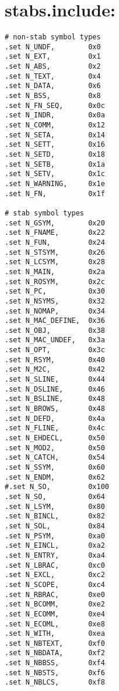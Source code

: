 \section{stabs.include:}
\label{anhang:stabs.include}
\begin{lstlisting}
# non-stab symbol types
.set N_UNDF,		0x0
.set N_EXT,			0x1
.set N_ABS,			0x2
.set N_TEXT,		0x4
.set N_DATA,		0x6
.set N_BSS,			0x8
.set N_FN_SEQ,		0x0c
.set N_INDR,		0x0a
.set N_COMM,		0x12
.set N_SETA,		0x14
.set N_SETT,		0x16
.set N_SETD,		0x18
.set N_SETB,		0x1a
.set N_SETV,		0x1c
.set N_WARNING,		0x1e
.set N_FN,			0x1f

# stab symbol types
.set N_GSYM,		0x20
.set N_FNAME,		0x22
.set N_FUN,			0x24
.set N_STSYM,		0x26
.set N_LCSYM,		0x28
.set N_MAIN,		0x2a
.set N_ROSYM,		0x2c
.set N_PC,			0x30
.set N_NSYMS,		0x32
.set N_NOMAP,		0x34
.set N_MAC_DEFINE,	0x36
.set N_OBJ,			0x38
.set N_MAC_UNDEF,	0x3a
.set N_OPT,			0x3c
.set N_RSYM,		0x40
.set N_M2C,			0x42
.set N_SLINE,		0x44
.set N_DSLINE,		0x46
.set N_BSLINE,		0x48
.set N_BROWS,		0x48
.set N_DEFD,		0x4a
.set N_FLINE,		0x4c
.set N_EHDECL,		0x50
.set N_MOD2,		0x50
.set N_CATCH,		0x54
.set N_SSYM,		0x60
.set N_ENDM,		0x62
#.set N_SO,			0x100
.set N_SO,			0x64
.set N_LSYM,		0x80
.set N_BINCL,		0x82
.set N_SOL,			0x84
.set N_PSYM,		0xa0
.set N_EINCL,		0xa2
.set N_ENTRY,		0xa4
.set N_LBRAC,		0xc0
.set N_EXCL,		0xc2
.set N_SCOPE,		0xc4
.set N_RBRAC,		0xe0
.set N_BCOMM,		0xe2
.set N_ECOMM,		0xe4
.set N_ECOML,		0xe8
.set N_WITH,		0xea
.set N_NBTEXT,		0xf0
.set N_NBDATA,		0xf2
.set N_NBBSS,		0xf4
.set N_NBSTS,		0xf6
.set N_NBLCS,		0xf8
\end{lstlisting}
